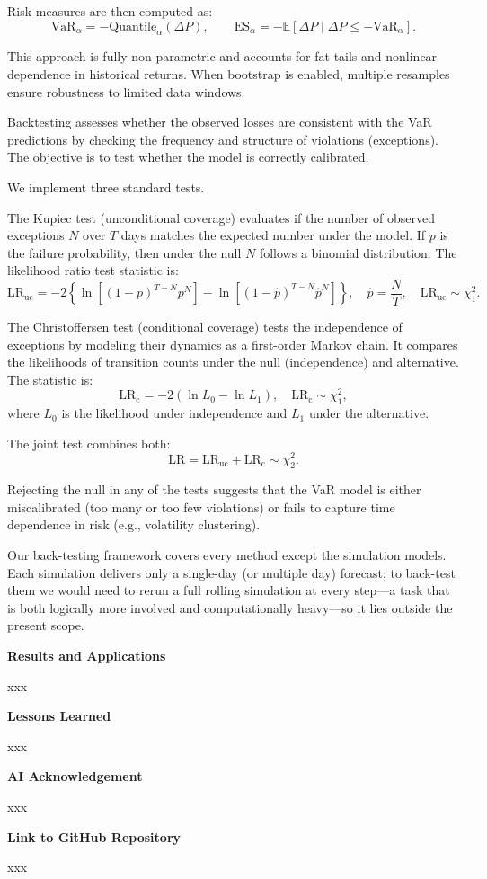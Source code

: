 \documentclass[12pt]{article}
\begin{document}
Risk measures are then computed as:
\[
\text{VaR}_\alpha = -\text{Quantile}_\alpha(\Delta P), \qquad
\text{ES}_\alpha = -\mathbb{E}[\Delta P \mid \Delta P \le -\text{VaR}_\alpha].
\]

This approach is fully non-parametric and accounts for fat tails and nonlinear dependence in historical returns. When bootstrap is enabled, multiple resamples ensure robustness to limited data windows.

\vspace{0.6em}

\underline{}

\vspace{0.6em}

Backtesting assesses whether the observed losses are consistent with the VaR predictions by checking the frequency and structure of violations (exceptions). The objective is to test whether the model is correctly calibrated.

We implement three standard tests.

The Kupiec test (unconditional coverage) evaluates if the number of observed exceptions $N$ over $T$ days matches the expected number under the model. If $p$ is the failure probability, then under the null $N$ follows a binomial distribution. The likelihood ratio test statistic is:
\[
\text{LR}_{\text{uc}} = -2 \left\{ \ln\left[(1 - p)^{T - N} p^N \right] - \ln\left[(1 - \hat{p})^{T - N} \hat{p}^N \right] \right\}, \quad \hat{p} = \frac{N}{T}, \quad \text{LR}_{\text{uc}} \sim \chi^2_1.
\]

The Christoffersen test (conditional coverage) tests the independence of exceptions by modeling their dynamics as a first-order Markov chain. It compares the likelihoods of transition counts under the null (independence) and alternative. The statistic is:
\[
\text{LR}_{\text{c}} = -2 (\ln L_0 - \ln L_1), \quad \text{LR}_{\text{c}} \sim \chi^2_1,
\]
where $L_0$ is the likelihood under independence and $L_1$ under the alternative.

The joint test combines both:
\[
\text{LR} = \text{LR}_{\text{uc}} + \text{LR}_{\text{c}} \sim \chi^2_2.
\]

Rejecting the null in any of the tests suggests that the VaR model is either miscalibrated (too many or too few violations) or fails to capture time dependence in risk (e.g., volatility clustering).

Our back-testing framework covers every method except the simulation models. Each simulation delivers only a single-day (or multiple day) forecast; to back-test them we would need to rerun a full rolling simulation at every step—a task that is both logically more involved and computationally heavy—so it lies outside the present scope.

\textbf{Results and Applications}

xxx

\textbf{Lessons Learned}

xxx

\textbf{AI Acknowledgement}

xxx

\textbf{Link to GitHub Repository}

xxx
\end{document}
